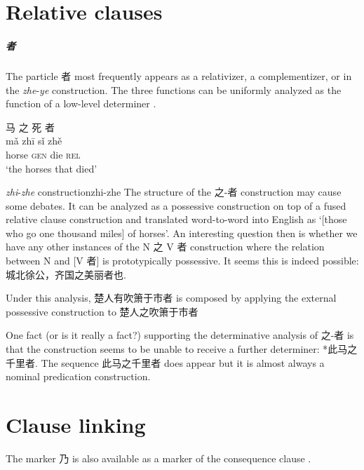 \documentclass[UTF8, a4paper, oneside, scheme=plain, 12pt]{ctexrep}
\newcommand*{\citepage}[1]{p.~{#1}}
\newcommand{\form}[1]{\emph{#1}}
\newcommand{\translate}[1]{`#1'}
\newcommand*{\category}[1]{\textsc{#1}}
\begin{document}
\chapter{Relative clauses}

\paragraph*{者} The particle 者 most frequently appears as a relativizer, a complementizer,
or in the \form{zhe}-\form{ye} construction.
The three functions can be uniformly analyzed as the function of a low-level determiner \citep{aldridge2009old}. 

\begin{exe}
    \ex\label{ex:grammatical.np.template.gen.2}
    \glll 马 之 死 者 \\
    mǎ zhī sǐ zhě \\
    horse \category{gen} die \category{rel} \\
    \glt\translate{the horses that died}
\end{exe}

\begin{todobox}{\form{zhi}-\form{zhe} construction}{zhi-zhe}
    The structure of the 之-者 construction may cause some debates.
    It can be analyzed as a possessive construction on top of a fused relative clause construction
    and translated word-to-word into English as 
    \translate{[those who go one thousand miles] of horses}.
    An interesting question then is whether we have any other instances of the N 之 V 者 construction
    where the relation between N and [V 者] is prototypically possessive.
    It seems this is indeed possible: 城北徐公，齐国之美丽者也.
    
    Under this analysis, 楚人有吹箫于市者 is composed by applying the external possessive construction
    to 楚人之吹箫于市者

    One fact (or is it really a fact?) supporting the determinative analysis of 之-者
    is that the construction seems to be unable to receive a further determiner:
    *此马之千里者.
    The sequence 此马之千里者 does appear but it is almost always a nominal predication construction.
\end{todobox}

\chapter{Clause linking}\label{chap:clause-linking}

The marker 乃 is also available as a marker of the consequence clause
\citep[\citepage{87}]{meiguang2018}.
\end{document}
